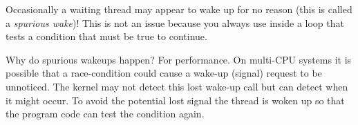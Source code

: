 Occasionally a waiting thread may appear to wake up for no reason (this is called a \emph{spurious wake})! This is not an issue because you always use  inside a loop that tests a condition that must be true to continue.

Why do spurious wakeups happen? For performance. On multi-CPU systems it is possible that a race-condition could cause a wake-up (signal) request to be unnoticed. The kernel may not detect this lost wake-up call but can detect when it might occur. To avoid the potential lost signal the thread is woken up so that the program code can test the condition again.

